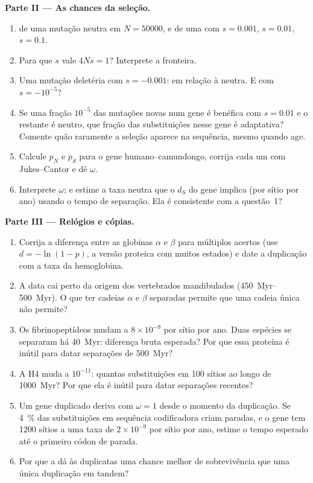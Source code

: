 \begin{problem}
\medskip
\noindent\textbf{Parte II --- As chances da seleção.}
\begin{enumerate}[resume]
  \item {} de uma mutação neutra em $N = \num{50000}$, e de uma com $s = 0.001$, $s = 0.01$, $s = 0.1$.
  \item Para que $s$ vale $4Ns = 1$? Interprete a fronteira.
  \item Uma mutação deletéria com $s = -0.001$: 
        em relação à neutra. E com $s = -10^{-5}$?
  \item Se uma fração $10^{-5}$ das mutações novas num gene é benéfica
        com $s = 0.01$ e o restante é neutro, que fração das substituições
        nesse gene é adaptativa? Comente quão raramente a seleção aparece
        na sequência, mesmo quando age.
  \item Calcule $p_{N}$ e $p_{S}$ para o gene humano--camundongo, corrija
        cada um com Jukes--Cantor e dê $\omega$.
  \item Interprete $\omega$; e estime a taxa neutra que o $d_{S}$ do gene
        implica (por sítio por ano) usando o tempo de separação. Ela é
        consistente com a questão~1?
\end{enumerate}

\medskip
\noindent\textbf{Parte III --- Relógios e cópias.}
\begin{enumerate}[resume]
  \item Corrija a diferença entre as globinas $\alpha$ e $\beta$ para
        múltiplos acertos (use $d = -\ln(1 - p)$, a versão proteica com
        muitos estados) e date a duplicação com a taxa da hemoglobina.
  \item A data cai perto da origem dos vertebrados mandibulados
        (\qtyrange{450}{500}{Myr}). O que ter cadeias $\alpha$ e $\beta$
        separadas permite que uma cadeia única não permite?
  \item Os fibrinopeptídeos mudam a $8\times 10^{-9}$ por sítio por ano.
        Duas espécies se separaram há \qty{40}{Myr}: diferença bruta
        esperada? Por que essa proteína é inútil para datar separações de
        \qty{500}{Myr}?
  \item A  H4 muda a $10^{-11}$: quantas substituições em 100
        sítios ao longo de \qty{1000}{Myr}? Por que ela é inútil para
        datar separações recentes?
  \item Um gene duplicado deriva com $\omega = 1$ desde o momento da
        duplicação. Se \qty{4}{\%} das substituições em sequência
        codificadora criam paradas, e o gene tem 1200 sítios a uma taxa
        de $2\times
        10^{-9}$ por sítio por ano, estime o tempo esperado
        até o primeiro códon de parada.
  \item Por que a  dá às duplicatas uma
        chance melhor de sobrevivência que uma única duplicação em
        tandem?
\end{enumerate}


\end{problem}

